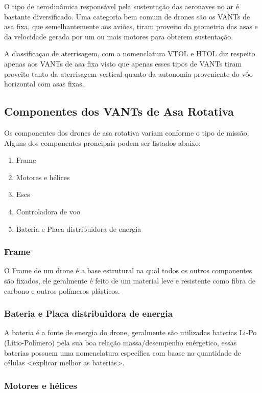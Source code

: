 \documentclass[12pt,a4paper,oneside]{book}
\begin{document}
O tipo de aerodinâmica responsável pela sustentação das aeronaves no ar é bastante diversificado. Uma categoria bem comum de drones são os VANTs de asa fixa, que semelhantemente aos aviões, tiram proveito da geometria das asas e da velocidade gerada por um ou mais motores para obterem sustentação. 

A classificaçao de aterrisagem, com a nomenclatura VTOL e HTOL diz respeito apenas aos VANTs de asa fixa visto que apenas esses tipos de VANTs tiram proveito tanto da aterrisagem vertical quanto da autonomia proveniente do vôo horizontal com asas fixas. 

\subsection{Componentes dos VANTs de Asa Rotativa}

Os componentes dos drones de asa rotativa variam conforme o tipo de missão. Alguns dos componentes proncipais podem ser listados abaixo:

\begin{enumerate}
  \item Frame
  \item Motores e hélices
  \item Escs
  \item Controladora de voo
  \item Bateria e Placa distribuidora de energia
\end{enumerate}
\subsubsection*{Frame}

O Frame de um drone é a base estrutural na qual todos os outros componentes são fixados, ele geralmente é feito de um material leve e 
resistente como fibra de carbono e outros polímeros plásticos. 

\subsubsection*{Bateria e Placa distribuidora de energia}

A bateria é a fonte de energia do drone, geralmente são utilizadas baterias Li-Po (Lítio-Polímero) pela sua boa relação massa/desempenho 
enérgetico, essas baterias possuem uma nomenclatura específica com baase na quantidade de células <explicar melhor as baterias>.

\subsubsection*{Motores e hélices}
\end{document}
